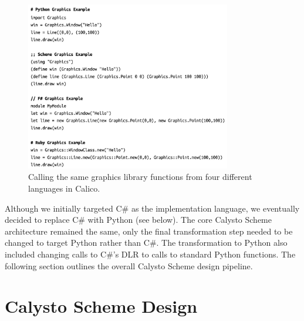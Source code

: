 \documentclass[acmsmall,screen,nonacm]{acmart}
\begin{document}

\begin{figure}[h]
  \includegraphics[width=0.8\textwidth]{graphics-scripts.jpg}
  \caption{Calling the same graphics library functions from four different languages in Calico.}
  \label{fig:scripts}
  \Description{}
\end{figure}


Although we initially targeted C\# as the implementation language, we
eventually decided to replace C\# with Python (see below). The core Calysto
Scheme architecture remained the same, only the final transformation step
needed to be changed to target Python rather than C\#. The transformation to
Python also included changing calls to C\#'s DLR to calls to standard Python
functions. The following section outlines the overall Calysto Scheme design
pipeline.


\section{Calysto Scheme Design}
\end{document}
